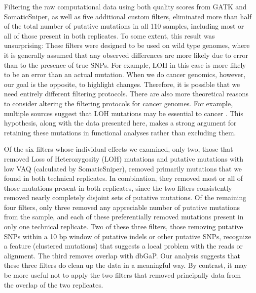 \documentclass[11pt]{article} %
\begin{document}
Filtering the raw computational data using both quality scores from GATK and SomaticSniper, as well as five additional custom filters, eliminated more than half of the total number of putative mutations in all 110 samples, including most or all of those present in both replicates. To some extent, this result was unsurprising: These filters were designed to be used on wild type genomes, where it is generally assumed that any observed differences are more likely due to error than to the presence of true SNPs. For example, LOH in this case is more likely to be an error than an actual mutation. When we do cancer genomics, however, our goal is the opposite, to highlight changes. Therefore, it is possible that we need entirely different filtering protocols. There are also more theoretical reasons to consider altering the filtering protocols for cancer genomes. For example, multiple sources suggest that LOH mutations may be essential to cancer \citep{LOH}. This hypothesis, along with the data presented here, makes a strong argument for retaining these mutations in functional analyses rather than excluding them.

Of the six filters whose individual effects we examined, only two, those that removed Loss of Heterozygosity (LOH) mutations and putative mutations with low VAQ (calculated by SomaticSniper), removed primarily mutations that we found in both technical replicates. In combination, they removed most or all of those mutations present in both replicates, since the two filters consistently removed nearly completely disjoint sets of putative mutations. Of the remaining four filters, only three removed any appreciable number of putative mutations from the sample, and each of these preferentially removed mutations present in only one technical replicate. Two of these three filters, those removing putative SNPs within a 10 bp window of putative indels or other putative SNPs, recognize a feature (clustered mutations) that suggests a local problem with the reads or alignment. The third removes overlap with dbGaP.  Our analysis suggests that these three filters do clean up the data in a meaningful way. By contrast, it may be more useful not to apply the two filters that removed principally data from the overlap of the two replicates.
\end{document}
